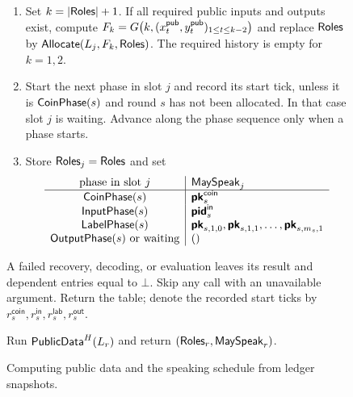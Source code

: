 \begin{figure}[!t]
{\begin{minipage}{0.95\textwidth}
\begin{description}
\begin{enumerate}
      \item Set $k=|\mathsf{Roles}|+1$.  If all required public inputs and outputs exist,
        compute $F_k=G\bigl(k,(x^{\mathsf{pub}}_t,y^{\mathsf{pub}}_t)_{1\le t\le k-2}\bigr)$ and replace
        $\mathsf{Roles}$ by $\mathsf{Allocate}(L_j,F_k,\mathsf{Roles})$.
        The required history is empty for $k=1,2$.
      \item Start the next phase in slot $j$ and record its start tick,
        unless it is $\mathsf{CoinPhase}(s)$ and round $s$ has not been allocated.
        In that case slot $j$ is waiting.  Advance along the phase
        sequence only when a phase starts.
      \item Store $\mathsf{Roles}_j=\mathsf{Roles}$ and set
        \[
        \begin{array}{c|l}
          \text{phase in slot }j&\mathsf{MaySpeak}_j\\\hline
          \mathsf{CoinPhase}(s)&\boldsymbol{\mathsf{pk}}^{\mathsf{coin}}_s\\
          \mathsf{InputPhase}(s)&\boldsymbol{\mathsf{pid}}^{\mathsf{in}}_s\\
          \mathsf{LabelPhase}(s)&\boldsymbol{\mathsf{pk}}_{s,1,0},\boldsymbol{\mathsf{pk}}_{s,1,1},\ldots,
                          \boldsymbol{\mathsf{pk}}_{s,m_s,1}\\
          \mathsf{OutputPhase}(s)\text{ or waiting}&()
        \end{array}
        \]
    \end{enumerate}
    A failed recovery, decoding, or evaluation leaves its result and
    dependent entries equal to $\bot$.  Skip any call with an unavailable
    argument.  Return the table; denote the recorded start ticks by
    $r_s^{\mathsf{coin}},r_s^{\mathsf{in}},r_s^{\mathsf{lab}},r_s^{\mathsf{out}}$.

  \item[$\Schedule(L_r)$.]
    Run $\mathsf{PublicData}^H(L_r)$ and return $(\mathsf{Roles}_r,\mathsf{MaySpeak}_r)$.
\end{description}
\end{minipage}}
\caption{Computing public data and the speaking schedule from ledger snapshots.}
\label{fig:protocol-schedule}
\end{figure}

